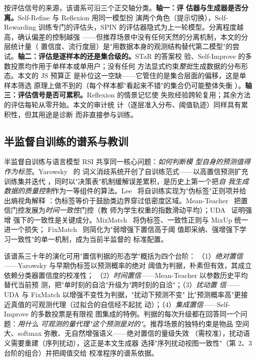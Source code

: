 按评估信号的来源，该谱系可沿三个正交轴分类。\textbf{轴一：评
估器与生成器是否分离。}Self-Refine 与 Reflexion 用同一模型扮
演两个角色（提示切换），Self-Rewarding 训练专门的评估头，SPIN
的评估器隐式为上一轮模型。分离程度越高，确认偏差的控制越强
——但推荐场景中没有任何天然的分离机制，本文的分层统计量（
置信度、流行度层）是"用数据本身的观测结构替代第二模型"的尝
试。\textbf{轴二：评估是逐样本的还是集合级的。}STaR 的答案校
验、Self-Improve 的多数投票均作用于单样本或单用户；没有任何
方法显式约束\emph{整批}生成数据的分布形态。本文的 JS 预算正
是补位这一空缺——它管住的是集合层面的偏移，这是单样本筛选
原理上做不到的（每个样本都"看起来不错"的集合仍可能整体失衡
）。\textbf{轴三：评估信号是否可累积。}Reflexion 的情景记忆使
失败经验跨轮复用；其余方法的评估每轮从零开始。本文的审计统
计（逐层准入分布、阈值轨迹）同样具有累积性，但其用途是诊断
而非直接参与训练。

\subsection{半监督自训练的谱系与教训}
半监督自训练与语言模型 RSI 共享同一核心问题：\emph{如何判断模
型自身的预测值得作为标签}。Yarowsky~\cite{yarowsky1995wsd} 的
词义消歧系统开创了自训练范式——以高置信预测扩充训练集并迭代
，同时以"决策表"机制缓解误差累积，是历史上第一个把\emph{自
我生成数据的质量控制}作为一等组件的算法。Lee~\cite%
{lee2013pseudo} 将自训练实现为"伪标签"正则项并给出熵视角解释
：伪标签等价于鼓励类边界穿过低密度区域。Mean-Teacher~\cite%
{tarvainen2017mean} 把置信门控发展为\emph{时间一致性}门控（教
师为学生权重的指数滑动平均）；UDA~\cite{xie2020uda} 证明强增
强下的一致性是关键成分。MixMatch~\cite{berthelot2019mixmatch}
将伪标签、一致性正则与 MixUp 统一进一个损失；
FixMatch~\cite{sohn2020fixmatch} 则简化为"弱增强下置信高于阈
值即采纳、强增强下学习一致性"的单一机制，成为当前半监督的
标准配置。

该谱系三十年的演化可用"置信判据的形态学"概括为四个台阶：
（1）\emph{绝对置信}——Yarowsky 与早期伪标签以预测概率的绝对
阈值为判据，朴素但有效，其成立依赖分类器置信度的校准性；
（2）\emph{时间置信}——Mean-Teacher 以参数历史平均替代当前预
测，把"单时刻的自洽"升级为"跨时刻的自洽"；（3）\emph{扰动置
信}——UDA 与 FixMatch 以增强不变性为判据，"扰动下预测不变"
比"预测概率高"更接近真值的可观测代理（过拟合的自信经不起扰
动）；（4）\emph{集成置信}——Self-Improve 的多数投票是有限视
图集成的特例。判据的每次升级都在回答同一个问题：\emph{用什么
可观测的量代理"这个预测是对的"}。推荐场景的独特约束是物品
空间大、softmax 弥散、无自然增强语义——绝对置信的量级失效
（需校准），扰动语义需要重建（序列扰动），这正是本文生成器
选择"序列扰动视图一致性"（第 2、3 台阶的组合）并把阈值交给
校准程序的谱系依据。

